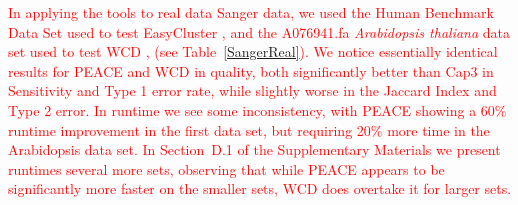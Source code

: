 \documentclass[a4,center,fleqn]{NAR}
\newcommand{\mc}[1]{\textcolor{red}{#1}}
\newcommand{\peace} {{\small PEACE}}
\newcommand{\wcd} {{\small WCD}}
\newcommand{\easycluster} {{\small EasyCluster}}
\begin{document}
\mc{In applying the tools to real data Sanger data, we used the Human
Benchmark Data Set used to test \easycluster\/ \cite{Picardi09}, and
the A076941.fa {\it Arabidopsis thaliana} data set used to test WCD
\cite{Hazelhurst08a,Hazelhurst08b}, (see Table~\ref{SangerReal}).  We notice essentially identical
results for PEACE and WCD in quality, both significantly better than
Cap3 in Sensitivity and Type 1 error rate, while slightly worse in the
Jaccard Index and Type 2 error.  In runtime we see some inconsistency,
with PEACE showing a 60\% runtime improvement in the first data set,
but requiring 20\% more time in the Arabidopsis data set.  In Section~D.1
of the Supplementary Materials we present runtimes several more
sets, observing that while \peace\/ appears to be significantly more
faster on the smaller sets, \wcd\/ does overtake it for larger sets.}
\end{document}
